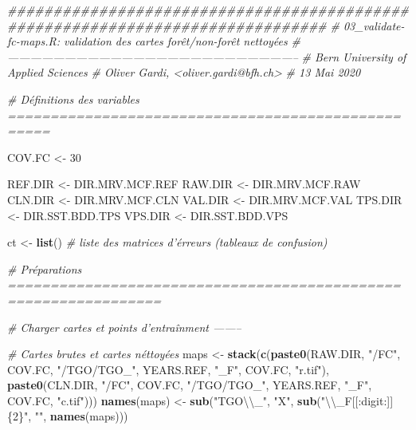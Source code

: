 \documentclass[a4paper, notitlepage, 12pt, krantz2]{krantz}
\newenvironment{Shaded}{\begin{snugshade}}{\end{snugshade}}
\newcommand{\CharTok}[1]{\textcolor[rgb]{0.31,0.60,0.02}{#1}}
\newcommand{\CommentTok}[1]{\textcolor[rgb]{0.56,0.35,0.01}{\textit{#1}}}
\newcommand{\DecValTok}[1]{\textcolor[rgb]{0.00,0.00,0.81}{#1}}
\newcommand{\KeywordTok}[1]{\textcolor[rgb]{0.13,0.29,0.53}{\textbf{#1}}}
\newcommand{\NormalTok}[1]{#1}
\newcommand{\StringTok}[1]{\textcolor[rgb]{0.31,0.60,0.02}{#1}}
\begin{document}
\begin{Shaded}
\begin{Highlighting}[]
\CommentTok{###############################################################################}
\CommentTok{# 03_validate-fc-maps.R: validation des cartes forêt/non-forêt nettoyées}
\CommentTok{# -----------------------------------------------------------------------------}
\CommentTok{# Bern University of Applied Sciences}
\CommentTok{# Oliver Gardi, <oliver.gardi@bfh.ch>}
\CommentTok{# 13 Mai 2020}


\CommentTok{# Définitions des variables ===================================================}

\NormalTok{COV.FC         <-}\StringTok{ }\DecValTok{30}

\NormalTok{REF.DIR <-}\StringTok{ }\NormalTok{DIR.MRV.MCF.REF}
\NormalTok{RAW.DIR <-}\StringTok{ }\NormalTok{DIR.MRV.MCF.RAW}
\NormalTok{CLN.DIR <-}\StringTok{ }\NormalTok{DIR.MRV.MCF.CLN}
\NormalTok{VAL.DIR <-}\StringTok{ }\NormalTok{DIR.MRV.MCF.VAL}
\NormalTok{TPS.DIR <-}\StringTok{ }\NormalTok{DIR.SST.BDD.TPS}
\NormalTok{VPS.DIR <-}\StringTok{ }\NormalTok{DIR.SST.BDD.VPS}



\NormalTok{ct <-}\StringTok{ }\KeywordTok{list}\NormalTok{()      }\CommentTok{# liste des matrices d'érreurs (tableaux de confusion)}


\CommentTok{# Préparations ================================================================}


\CommentTok{# Charger cartes et points d'entraînment --------}

\CommentTok{# Cartes brutes et cartes néttoyées}
\NormalTok{maps <-}\StringTok{ }\KeywordTok{stack}\NormalTok{(}\KeywordTok{c}\NormalTok{(}\KeywordTok{paste0}\NormalTok{(RAW.DIR, }\StringTok{"/FC"}\NormalTok{, COV.FC, }\StringTok{"/TGO/TGO_"}\NormalTok{, YEARS.REF, }\StringTok{"_F"}\NormalTok{, COV.FC, }\StringTok{"r.tif"}\NormalTok{),}
                \KeywordTok{paste0}\NormalTok{(CLN.DIR, }\StringTok{"/FC"}\NormalTok{, COV.FC, }\StringTok{"/TGO/TGO_"}\NormalTok{, YEARS.REF, }\StringTok{"_F"}\NormalTok{, COV.FC, }\StringTok{"c.tif"}\NormalTok{)))}
\KeywordTok{names}\NormalTok{(maps) <-}\StringTok{ }\KeywordTok{sub}\NormalTok{(}\StringTok{"TGO}\CharTok{\textbackslash{}\textbackslash{}}\StringTok{_"}\NormalTok{, }\StringTok{"X"}\NormalTok{, }\KeywordTok{sub}\NormalTok{(}\StringTok{"}\CharTok{\textbackslash{}\textbackslash{}}\StringTok{_F[[:digit:]]\{2\}"}\NormalTok{, }\StringTok{""}\NormalTok{, }\KeywordTok{names}\NormalTok{(maps)))}


\end{Highlighting}
\end{Shaded}
\end{document}
